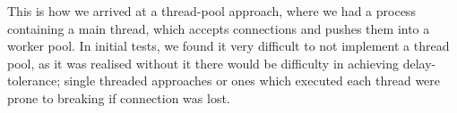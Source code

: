 \documentclass[11pt]{article}
\begin{document}

This is how we arrived at a thread-pool approach, where we had a process containing a main thread, which accepts connections and pushes them into a worker pool. In initial tests, we found it very difficult to not implement a thread pool, as it was realised without it there would be difficulty in achieving delay-tolerance; single threaded approaches or ones which executed each thread were prone to breaking if connection was lost.  \\

\begin{figure}[h]
\end{figure}
\end{document}
